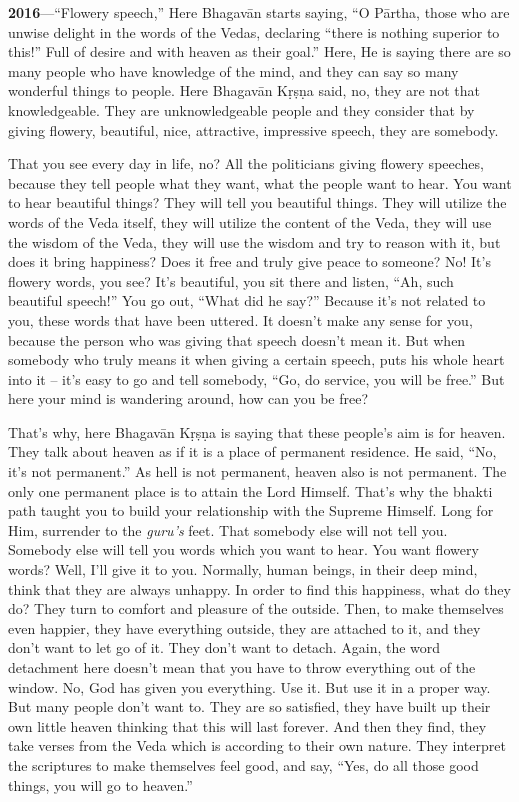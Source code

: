 \textbf{2016}---“Flowery speech,” Here Bhagavān starts saying, “O Pārtha, those who are unwise delight in the words of the Vedas, declaring “there is nothing superior to this!” Full of desire and with heaven as their goal.” Here, He is saying there are so many people who have knowledge of the mind, and they can say so many wonderful things to people. Here Bhagavān Kṛṣṇa said, no, they are not that knowledgeable. They are unknowledgeable people and they consider that by giving flowery, beautiful, nice, attractive, impressive speech, they are somebody.

That you see every day in life, no? All the politicians giving flowery speeches, because they tell people what they want, what the people want to hear. You want to hear beautiful things? They will tell you beautiful things. They will utilize the words of the Veda itself, they will utilize the content of the Veda, they will use the wisdom of the Veda, they will use the wisdom and try to reason with it, but does it bring happiness? Does it free and truly give peace to someone? No! It’s flowery words, you see? It’s beautiful, you sit there and listen, “Ah, such beautiful speech!” You go out, “What did he say?” Because it’s not related to you, these words that have been uttered. It doesn’t make any sense for you, because the person who was giving that speech doesn’t mean it. But when somebody who truly means it when giving a certain speech, puts his whole heart into it – it’s easy to go and tell somebody, “Go, do service, you will be free.” But here your mind is wandering around, how can you be free?

That’s why, here Bhagavān Kṛṣṇa is saying that these people’s aim is for heaven. They talk about heaven as if it is a place of permanent residence. He said, “No, it’s not permanent.” As hell is not permanent, heaven also is not permanent. The only one permanent place is to attain the Lord Himself. That’s why the bhakti path taught you to build your relationship with the Supreme Himself. Long for Him, surrender to the \textit{\textit{guru’s}} feet. That somebody else will not tell you. Somebody else will tell you words which you want to hear. You want flowery words? Well, I’ll give it to you. Normally, human beings, in their deep mind, think that they are always unhappy. In order to find this happiness, what do they do? They turn to comfort and pleasure of the outside. Then, to make themselves even happier, they have everything outside, they are attached to it, and they don’t want to let go of it. They don’t want to detach. Again, the word detachment here doesn’t mean that you have to throw everything out of the window. No, God has given you everything. Use it. But use it in a proper way. But many people don’t want to. They are so satisfied, they have built up their own little heaven thinking that this will last forever. And then they find, they take verses from the Veda which is according to their own nature. They interpret the scriptures to make themselves feel good, and say, “Yes, do all those good things, you will go to heaven.”

